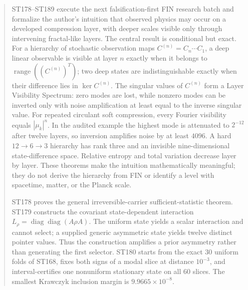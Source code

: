 \documentclass[11pt,a4paper]{article}
\begin{document}
\begin{abstract}
ST178--ST189 execute the next falsification-first FIN research batch and formalize the author's intuition that observed physics may occur on a developed compression layer, with deeper scales visible only through intervening fractal-like layers. The central result is conditional but exact. For a hierarchy of stochastic observation maps $C^{(n)}=C_n\cdots C_1$, a deep linear observable is visible at layer $n$ exactly when it belongs to $\operatorname{range}((C^{(n)})^T)$; two deep states are indistinguishable exactly when their difference lies in $\ker C^{(n)}$. The singular values of $C^{(n)}$ form a Layer Visibility Spectrum: zero modes are lost, while nonzero modes can be inverted only with noise amplification at least equal to the inverse singular value. For repeated circulant soft compression, every Fourier visibility equals $|\mu_k|^n$. In the audited example the highest mode is attenuated to $2^{-12}$ after twelve layers, so inversion amplifies noise by at least $4096$. A hard $12\to6\to3$ hierarchy has rank three and an invisible nine-dimensional state-difference space. Relative entropy and total variation decrease layer by layer. These theorems make the intuition mathematically meaningful; they do not derive the hierarchy from FIN or identify a level with spacetime, matter, or the Planck scale.

ST178 proves the general irreversible-carrier sufficient-statistic theorem. ST179 constructs the covariant state-dependent interaction $L_\rho=\operatorname{diag}\operatorname{diag}(A\rho A)$. The uniform state yields a scalar interaction and cannot select; a supplied generic asymmetric state yields twelve distinct pointer values. Thus the construction amplifies a prior asymmetry rather than generating the first selector. ST180 starts from the exact 30 uniform folds of ST168, fixes both signs of a modal slice at distance $10^{-3}$, and interval-certifies one nonuniform stationary state on all 60 slices. The smallest Krawczyk inclusion margin is $9.9665\times10^{-8}$.


\end{abstract}
\end{document}
